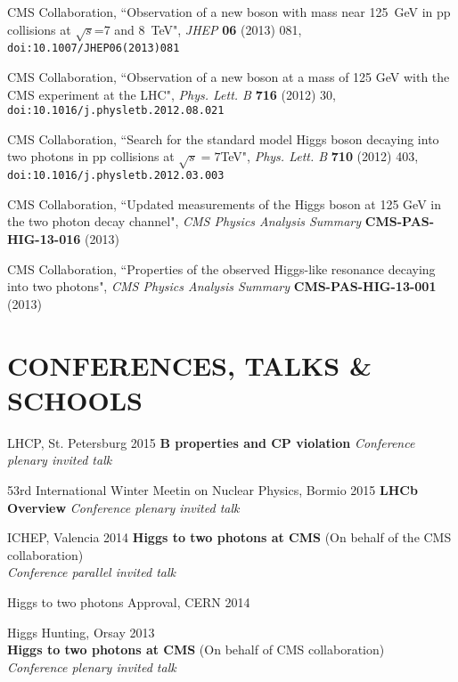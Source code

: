 \documentclass[margin, 10pt]{res} %
\begin{document}
\begin{resume}
CMS Collaboration, ``Observation of a new boson with mass near 125~GeV in pp collisions at $\sqrt{s}$=7 and 8~TeV",
\textit{JHEP}
\textbf{06} (2013) 081,
\texttt{doi:10.1007/JHEP06(2013)081}

CMS Collaboration, ``Observation of a new boson at a mass of 125 GeV with the CMS experiment at the LHC",
\textit{Phys. Lett. B}
\textbf{716} (2012) 30,
\texttt{\newline doi:10.1016/j.physletb.2012.08.021}

CMS Collaboration, ``Search for the standard model Higgs boson decaying into two photons in pp collisions at $\sqrt{s}=7$TeV",
\textit{Phys. Lett. B}
\textbf{710} (2012) 403,
\texttt{\newline doi:10.1016/j.physletb.2012.03.003}

CMS Collaboration, ``Updated measurements of the Higgs boson at 125 GeV in the two photon decay channel",
\textit{CMS Physics Analysis Summary}
\textbf{CMS-PAS-HIG-13-016} (2013)

CMS Collaboration, ``Properties of the observed Higgs-like resonance decaying into two photons",
\textit{CMS Physics Analysis Summary}
\textbf{CMS-PAS-HIG-13-001} (2013)


\section{CONFERENCES, TALKS \& SCHOOLS}

LHCP, St. Petersburg 2015
\textbf{B properties and CP violation}
\textit{Conference plenary invited talk}

53rd International Winter Meetin on Nuclear Physics, Bormio 2015
\textbf{LHCb Overview}
\textit{Conference plenary invited talk}

ICHEP, Valencia 2014
\textbf{Higgs to two photons at CMS} (On behalf of the CMS collaboration) \\
\textit{Conference parallel invited talk}

Higgs to two photons Approval, CERN 2014

Higgs Hunting, Orsay 2013 \\
\textbf{Higgs to two photons at CMS} (On behalf of CMS collaboration) \\
\textit{Conference plenary invited talk}


\end{resume}
\end{document}
